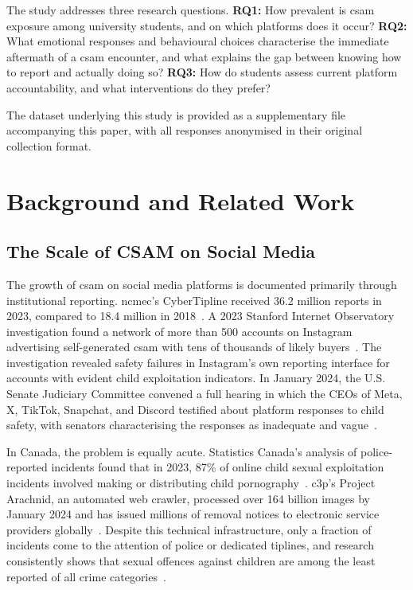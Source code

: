 \documentclass{ieee-portfolio}
\begin{document}
The study addresses three research questions. \textbf{RQ1:} How prevalent is \gls{csam} exposure among university students, and on which platforms does it occur? \textbf{RQ2:} What emotional responses and behavioural choices characterise the immediate aftermath of a \gls{csam} encounter, and what explains the gap between knowing how to report and actually doing so? \textbf{RQ3:} How do students assess current platform accountability, and what interventions do they prefer?
 
The dataset underlying this study is provided as a supplementary file accompanying this paper, with all responses anonymised in their original collection format.
 
\section{Background and Related Work}
 
\subsection{The Scale of CSAM on Social Media}
 
The growth of \gls{csam} on social media platforms is documented primarily through institutional reporting. \gls{ncmec}'s CyberTipline received 36.2 million reports in 2023, compared to 18.4 million in 2018~\cite{ncmec_2023}. A 2023 Stanford Internet Observatory investigation found a network of more than 500 accounts on Instagram advertising self-generated \gls{csam} with tens of thousands of likely buyers~\cite{diresta_investigation_2023}. The investigation revealed safety failures in Instagram's own reporting interface for accounts with evident child exploitation indicators. In January 2024, the U.S. Senate Judiciary Committee convened a full hearing in which the CEOs of Meta, X, TikTok, Snapchat, and Discord testified about platform responses to child safety, with senators characterising the responses as inadequate and vague~\cite{us_protecting_2023}.
 
In Canada, the problem is equally acute. Statistics Canada's analysis of police-reported incidents found that in 2023, 87\% of online child sexual exploitation incidents involved making or distributing child pornography~\cite{savage_online_2024}. \gls{c3p}'s Project Arachnid, an automated web crawler, processed over 164 billion images by January 2024 and has issued millions of removal notices to electronic service providers globally~\cite{savage_online_2024}. Despite this technical infrastructure, only a fraction of incidents come to the attention of police or dedicated tiplines, and research consistently shows that sexual offences against children are among the least reported of all crime categories~\cite{savage_online_2024}.
 
\end{document}
